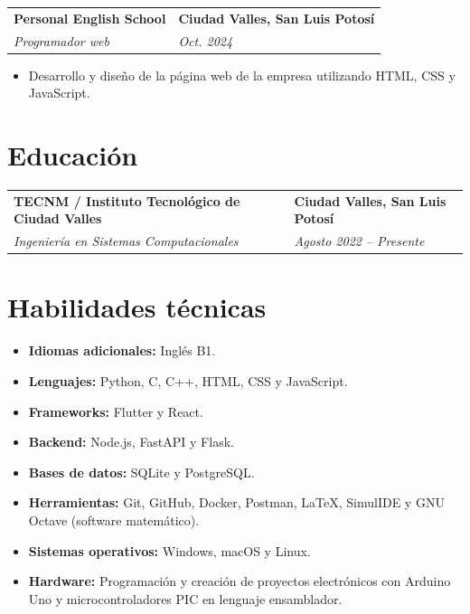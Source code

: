 \documentclass[10pt,letterpaper]{article}
\makeatletter
\newcommand{\cvheading}[4]{%
  \begin{tabularx}{\textwidth}{@{}X>{\raggedleft\arraybackslash}p{4.0cm}@{}}
    \textbf{#1} & \textbf{#2}\\
    \textit{#3} & \textit{#4}
  \end{tabularx}
}
\makeatother
\begin{document}
\vspace{3pt}
\cvheading
  {Personal English School}
  {Ciudad Valles, San Luis Potosí}
  {Programador web}
  {Oct. 2024}
\begin{itemize}
  \item Desarrollo y diseño de la página web de la empresa utilizando HTML, CSS y JavaScript.
\end{itemize}

\section*{Educación}

\cvheading
  {TECNM / Instituto Tecnológico de Ciudad Valles}
  {Ciudad Valles, San Luis Potosí}
  {Ingeniería en Sistemas Computacionales}
  {Agosto 2022 -- Presente}

\section*{Habilidades técnicas}
\begin{itemize}
  \item \textbf{Idiomas adicionales:} Inglés B1.
  \item \textbf{Lenguajes:} Python, C, C++, HTML, CSS y JavaScript.
  \item \textbf{Frameworks:} Flutter y React.
  \item \textbf{Backend:} Node.js, FastAPI y Flask.
  \item \textbf{Bases de datos:} SQLite y PostgreSQL.
  \item \textbf{Herramientas:} Git, GitHub, Docker, Postman, LaTeX, SimulIDE y GNU Octave (software matemático).
  \item \textbf{Sistemas operativos:} Windows, macOS y Linux.
  \item \textbf{Hardware:} Programación y creación de proyectos electrónicos con Arduino Uno y microcontroladores PIC en lenguaje ensamblador.
\end{itemize}
\end{document}
